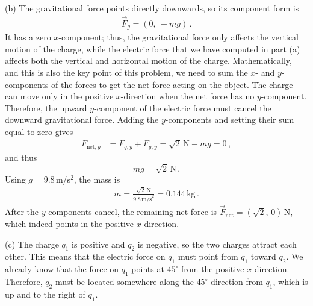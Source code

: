 \documentclass[11pt]{article}
\begin{document}
\noindent (b) The gravitational force points directly downwards, so its component form is
\begin{align*}
\vec{F}_g = (0,\ -mg)\,.
\end{align*}
It has a zero $x$-component; thus, the gravitational force only affects the vertical motion of the charge, while the electric force that we have computed in part (a) affects both the vertical and horizontal motion of the charge. Mathematically, and this is also the key point of this problem, we need to sum the $x$- and $y$-components of the forces to get the net force acting on the object. The charge can move only in the positive $x$-direction when the net force has no $y$-component. Therefore, the upward $y$-component of the electric force must cancel the downward gravitational force. Adding the $y$-components and setting their sum equal to zero gives
\begin{align*}
F_{\text{net},y} &= F_{q,y}+F_{g,y}=\sqrt{2}\,\text{N}-mg =0\,,
\end{align*}
and thus 
$$mg = \sqrt{2}\,\text{N}\,.$$
Using $g=9.8$\,m/s$^2$, the mass is
\begin{align*}
m = \frac{\sqrt{2}\,\text{N}}{9.8\,\text{m/s}^2}
=0.144\,\text{kg}\,.
\end{align*}
After the $y$-components cancel, the remaining net force is $\vec{F}_{\text{net}}=(\sqrt{2},\,0)$\,N, which indeed points in the positive $x$-direction.\vspace{0.2cm}

\noindent (c) The charge $q_1$ is positive and $q_2$ is negative, so the two charges attract each other. This means that the electric force on $q_1$ must point from $q_1$ toward $q_2$. We already know that the force on $q_1$ points at $45^\circ$ from the positive $x$-direction. Therefore, $q_2$ must be located somewhere along the $45^\circ$ direction from $q_1$, which is up and to the right of $q_1$.\vspace{0.2cm}
\end{document}
